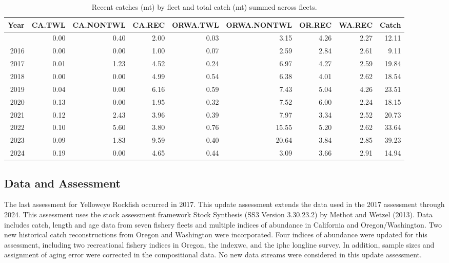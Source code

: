 \documentclass[
]{scrartcl}
\begin{document}
\begin{landscape}
\begingroup
\setlength{}
\setlength{}\fontsize{9.0pt}{10.8pt}\selectfont

\begin{longtable}{@{\extracolsep{\fill}}rrrrrrrrr}

\caption{\label{tbl-es-catches}Recent catches (mt) by fleet and total
catch (mt) summed across fleets.}

\tabularnewline

\toprule
Year & CA.TWL & CA.NONTWL & CA.REC & ORWA.TWL & ORWA.NONTWL & OR.REC & WA.REC & Catch \\ 
\midrule\addlinespace[2.5pt]
2015 & 0.00 & 0.40 & 2.00 & 0.03 & 3.15 & 4.26 & 2.27 & 12.11 \\ 
2016 & 0.00 & 0.00 & 1.00 & 0.07 & 2.59 & 2.84 & 2.61 & 9.11 \\ 
2017 & 0.01 & 1.23 & 4.52 & 0.24 & 6.97 & 4.27 & 2.59 & 19.84 \\ 
2018 & 0.00 & 0.00 & 4.99 & 0.54 & 6.38 & 4.01 & 2.62 & 18.54 \\ 
2019 & 0.04 & 0.00 & 6.16 & 0.59 & 7.43 & 5.04 & 4.26 & 23.51 \\ 
2020 & 0.13 & 0.00 & 1.95 & 0.32 & 7.52 & 6.00 & 2.24 & 18.15 \\ 
2021 & 0.12 & 2.43 & 3.96 & 0.39 & 7.97 & 3.34 & 2.52 & 20.73 \\ 
2022 & 0.10 & 5.60 & 3.80 & 0.76 & 15.55 & 5.20 & 2.62 & 33.64 \\ 
2023 & 0.09 & 1.83 & 9.59 & 0.40 & 20.64 & 3.84 & 2.85 & 39.23 \\ 
2024 & 0.19 & 0.00 & 4.65 & 0.44 & 3.09 & 3.66 & 2.91 & 14.94 \\ 
\bottomrule

\end{longtable}

\endgroup

\end{landscape}

\clearpage

\subsection*{Data and Assessment}\label{data-and-assessment}

The last assessment for Yelloweye Rockfish occurred in 2017. This update
assessment extends the data used in the 2017 assessment through 2024.
This assessment uses the stock assessment framework Stock Synthesis (SS3
Version 3.30.23.2) by Methot and Wetzel (2013). Data includes catch,
length and age data from seven fishery fleets and multiple indices of
abundance in California and Oregon/Washington. Two new historical catch
reconstructions from Oregon and Washington were incorporated. Four
indices of abundance were updated for this assessment, including two
recreational fishery indices in Oregon, the \gls{indexwc}, and the
\gls{iphc} longline survey. In addition, sample sizes and assignment of
aging error were corrected in the compositional data. No new data
streams were considered in this update assessment.
\end{document}
